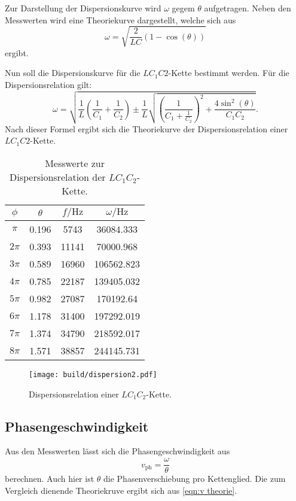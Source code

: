 Zur Darstellung der Dispersionskurve wird $\omega$ gegem $\theta$ aufgetragen. Neben den Messwerten wird eine Theoriekurve dargestellt, welche sich aus
\begin{equation}
  \omega = \sqrt{\frac{2}{LC}(1-\cos(\theta))}
\end{equation}
ergibt.

 Nun soll die Dispersionskurve für die $LC_{1}C{2}$-Kette bestimmt werden.
 Für die Dispersionsrelation gilt:
 \begin{equation}
  \omega = \sqrt{\frac{1}{L}\left(\frac{1}{C_{1}}+\frac{1}{C_{2}}\right)\pm\frac{1}{L}\sqrt{\left(\frac{1}{C_{1}+\frac{1}{C_2}}\right)^2 + \frac{4\sin^2(\theta)}{C_{1}C_{2}}}}.
  \end{equation}
  Nach dieser Formel ergibt sich die Theoriekurve der Dispersionsrelation einer $LC_{1}C{2}$-Kette.

\begin{table}
  \centering
  \caption{Messwerte zur Dispersionsrelation der $LC_{1}C_{2}$-Kette.}
  \label{tab:dispersion2}
  \begin{tabular}{c c c c}
    \toprule
    $\phi$ & $\theta$ & $f / \si{\hertz}$ & $\omega / \si{\hertz}$ \\
    \midrule
    $\pi$ & 0.196 & 5743 & 36084.333 \\
    $2\pi$ & 0.393 & 11141 & 70000.968 \\
    $3\pi$ & 0.589 & 16960 & 106562.823 \\
    $4\pi$ & 0.785 & 22187 & 139405.032 \\
    $5\pi$ & 0.982 & 27087 & 170192.64 \\
    $6\pi$ & 1.178 & 31400 & 197292.019 \\
    $7\pi$ & 1.374 & 34790 & 218592.017 \\
    $8\pi$ & 1.571 & 38857 & 244145.731 \\
    \bottomrule
    \end{tabular}
  \end{table}

  \begin{figure}
    \centering
    \texttt{[image: build/dispersion2.pdf]}
  \caption{Dispersionsrelation einer $LC_{1}C_{2}$-Kette.}
    \label{fig:dispersion-lc1c2}
  \end{figure}

  \subsection{Phasengeschwindigkeit}
  Aus den Messwerten lässt sich die Phasengeschwindigkeit aus
  \begin{equation}
    v_\mathrm{ph} = \frac{\omega}{\theta}
  \end{equation}
  berechnen. Auch hier ist $\theta$ die Phasenverschiebung pro Kettenglied.
  Die zum Vergleich dienende Theoriekruve ergibt sich aus \ref{eqn:v theorie}.


